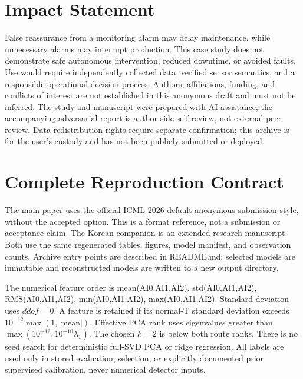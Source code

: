 \documentclass{article}
\begin{document}
\section*{Impact Statement}
False reassurance from a monitoring alarm may delay maintenance, while unnecessary alarms may interrupt production. This case study does not demonstrate safe autonomous intervention, reduced downtime, or avoided faults. Use would require independently collected data, verified sensor semantics, and a responsible operational decision process. Authors, affiliations, funding, and conflicts of interest are not established in this anonymous draft and must not be inferred. The study and manuscript were prepared with AI assistance; the accompanying adversarial report is author-side self-review, not external peer review. Data redistribution rights require separate confirmation; this archive is for the user's custody and has not been publicly submitted or deployed.


\clearpage
\appendix
\onecolumn
\section{Complete Reproduction Contract}
The main paper uses the official ICML 2026 default anonymous submission style, without the accepted option. This is a format reference, not a submission or acceptance claim. The Korean companion is an extended research manuscript. Both use the same regenerated tables, figures, model manifest, and observation counts. Archive entry points are described in README.md; selected models are immutable and reconstructed models are written to a new output directory.

The numerical feature order is mean(AI0,AI1,AI2), std(AI0,AI1,AI2), RMS(AI0,AI1,AI2), min(AI0,AI1,AI2), max(AI0,AI1,AI2). Standard deviation uses $ddof=0$. A feature is retained if its normal-T standard deviation exceeds $10^{-12}\max(1,|\mathrm{mean}|)$. Effective PCA rank uses eigenvalues greater than $\max(10^{-12},10^{-10}\lambda_1)$. The chosen $k=2$ is below both route ranks. There is no seed search for deterministic full-SVD PCA or ridge regression. All labels are used only in stored evaluation, selection, or explicitly documented prior supervised calibration, never numerical detector inputs.
\end{document}
